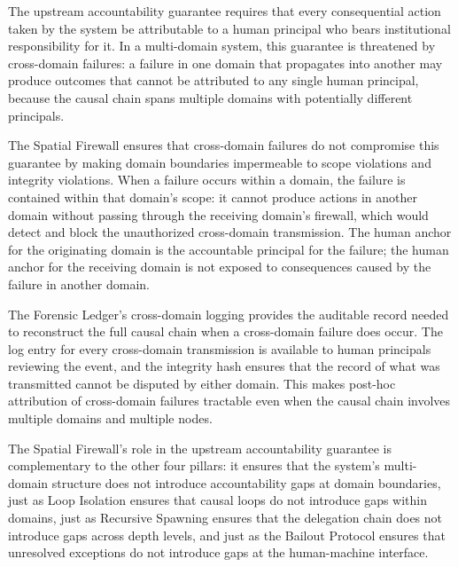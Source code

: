 The upstream accountability guarantee requires that every consequential action taken by the system be attributable to a human principal who bears institutional responsibility for it. In a multi-domain system, this guarantee is threatened by cross-domain failures: a failure in one domain that propagates into another may produce outcomes that cannot be attributed to any single human principal, because the causal chain spans multiple domains with potentially different principals.

The Spatial Firewall ensures that cross-domain failures do not compromise this guarantee by making domain boundaries impermeable to scope violations and integrity violations. When a failure occurs within a domain, the failure is contained within that domain's scope: it cannot produce actions in another domain without passing through the receiving domain's firewall, which would detect and block the unauthorized cross-domain transmission. The human anchor for the originating domain is the accountable principal for the failure; the human anchor for the receiving domain is not exposed to consequences caused by the failure in another domain.

The Forensic Ledger's cross-domain logging provides the auditable record needed to reconstruct the full causal chain when a cross-domain failure does occur. The log entry for every cross-domain transmission is available to human principals reviewing the event, and the integrity hash ensures that the record of what was transmitted cannot be disputed by either domain. This makes post-hoc attribution of cross-domain failures tractable even when the causal chain involves multiple domains and multiple nodes.

The Spatial Firewall's role in the upstream accountability guarantee is complementary to the other four pillars: it ensures that the system's multi-domain structure does not introduce accountability gaps at domain boundaries, just as Loop Isolation ensures that causal loops do not introduce gaps within domains, just as Recursive Spawning ensures that the delegation chain does not introduce gaps across depth levels, and just as the Bailout Protocol ensures that unresolved exceptions do not introduce gaps at the human-machine interface.